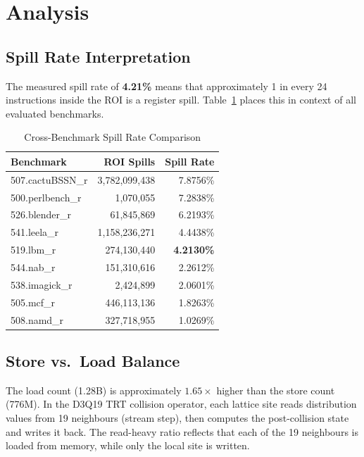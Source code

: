 \documentclass[conference]{IEEEtran}
\begin{document}
\section{Analysis}

\subsection{Spill Rate Interpretation}

The measured spill rate of \textbf{4.21\%} means that approximately
1 in every 24 instructions inside the ROI is a register spill.
Table~\ref{tab:compare} places this in context of all evaluated benchmarks.

\begin{table}[H]
\centering
\caption{Cross-Benchmark Spill Rate Comparison}
\label{tab:compare}
\begin{tabular}{lrr}
\toprule
\textbf{Benchmark} & \textbf{ROI Spills} & \textbf{Spill Rate} \\
\midrule
507.cactuBSSN\_r & 3,782,099,438 & 7.8756\% \\
500.perlbench\_r &     1,070,055 & 7.2838\% \\
526.blender\_r   &    61,845,869 & 6.2193\% \\
541.leela\_r     & 1,158,236,271 & 4.4438\% \\
519.lbm\_r       &   274,130,440 & \textbf{4.2130\%} \\
544.nab\_r       &   151,310,616 & 2.2612\% \\
538.imagick\_r   &     2,424,899 & 2.0601\% \\
505.mcf\_r       &   446,113,136 & 1.8263\% \\
508.namd\_r      &   327,718,955 & 1.0269\% \\
\bottomrule
\end{tabular}
\end{table}

\subsection{Store vs.\ Load Balance}

The load count (1.28B) is approximately $1.65\times$ higher than the
store count (776M). In the D3Q19 TRT collision operator, each lattice
site reads distribution values from 19 neighbours (stream step), then
computes the post-collision state and writes it back. The read-heavy
ratio reflects that each of the 19 neighbours is loaded from memory,
while only the local site is written.
\end{document}
